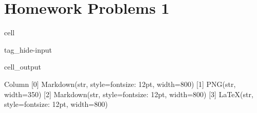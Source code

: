 \documentclass[letterpaper,10pt,english]{jupyterBook}
\begin{document}
\section{Homework Problems 1}
\label{\detokenize{content/tutorials/T4/tutorial_04:homework-problems-1}}
\begin{sphinxuseclass}{cell}
\begin{sphinxuseclass}{tag_hide-input}\begin{sphinxVerbatimOutput}

\begin{sphinxuseclass}{cell_output}
\begin{sphinxVerbatim}[commandchars=\\\{\}]
Column
    [0] Markdown(str, style=\PYGZob{}\PYGZsq{}font\PYGZhy{}size\PYGZsq{}: \PYGZsq{}12pt\PYGZsq{}\PYGZcb{}, width=800)
    [1] PNG(str, width=350)
    [2] Markdown(str, style=\PYGZob{}\PYGZsq{}font\PYGZhy{}size\PYGZsq{}: \PYGZsq{}12pt\PYGZsq{}\PYGZcb{}, width=800)
    [3] LaTeX(str, style=\PYGZob{}\PYGZsq{}font\PYGZhy{}size\PYGZsq{}: \PYGZsq{}12pt\PYGZsq{}\PYGZcb{}, width=800)
\end{sphinxVerbatim}

\end{sphinxuseclass}\end{sphinxVerbatimOutput}

\end{sphinxuseclass}
\end{sphinxuseclass}
\end{document}
